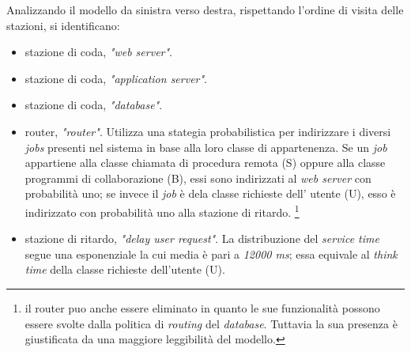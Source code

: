 \documentclass[../main.tex]{subfiles}
\begin{document}
    Analizzando il modello da sinistra verso destra, rispettando l'ordine di visita delle stazioni, si identificano:
    \begin{itemize}
        \item stazione di coda, \textit{"web server"}.
        \item stazione di coda, \textit{"application server"}.
        \item stazione di coda, \textit{"database"}.
        \item router, \textit{"router"}. Utilizza una stategia probabilistica per indirizzare i diversi \textit{jobs} presenti nel sistema in base alla loro classe di appartenenza.
        Se un \textit{job} appartiene alla classe chiamata di procedura remota (S) oppure alla classe programmi di collaborazione (B), essi sono indirizzati al \textit{web server} con probabilità uno;
        se invece il \textit{job} è dela classe richieste dell' utente (U), esso è indirizzato con probabilità uno alla stazione di ritardo. \footnote{il router puo anche essere eliminato in quanto le sue funzionalità possono essere svolte dalla politica di \textit{routing} del \textit{database}. Tuttavia la sua presenza è giustificata da una maggiore leggibilità del modello.}
        \item stazione di ritardo, \textit{"delay user request"}. La distribuzione del \textit{service time} segue una esponenziale la cui media è pari a \textit{12000 ms};
        essa equivale al \textit{think time} della classe richieste dell'utente (U).

    \end{itemize}
\end{document}
